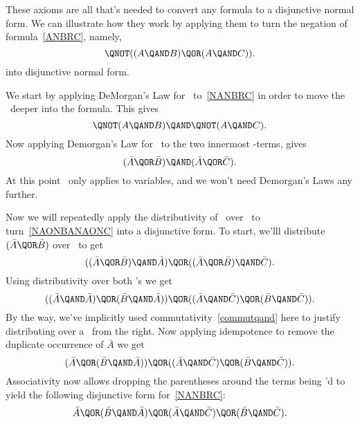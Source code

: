 These axioms are all that's needed to convert any formula to a
disjunctive normal form.  We can illustrate how they work by applying
them to turn the negation of formula~\eqref{ANBRC}, namely,
\begin{equation}\label{NANBRC}
\QNOT((A \QAND B) \QOR (A \QAND C)).
\end{equation}
into disjunctive normal form.

We start by applying DeMorgan's Law for \QOR\ to~\eqref{NANBRC} in
order to move the \QNOT\ deeper into the formula.  This gives
\[
\QNOT(A \QAND B) \QAND \QNOT(A \QAND C).
\]
Now applying Demorgan's Law for \QAND\ to the two
innermost \QAND-terms, gives
\begin{equation}\label{NAONBANAONC}
(\bar{A} \QOR \bar{B}) \QAND (\bar{A} \QOR \bar{C}).
\end{equation}
At this point \QNOT\ only applies to variables, and we won't need
Demorgan's Laws any further.

Now we will repeatedly apply the distributivity of \QAND\ over \QOR\ to
turn~\eqref{NAONBANAONC} into a disjunctive form.  To start, we'lll distribute
$(\bar{A} \QOR \bar{B})$ over \QOR\ to get
\[
((\bar{A} \QOR \bar{B}) \QAND \bar{A}) \QOR ((\bar{A} \QOR \bar{B}) \QAND \bar{C}).
\]
Using distributivity over both \QAND's we get
\[
((\bar{A} \QAND \bar{A}) \QOR (\bar{B} \QAND \bar{A})) \QOR 
((\bar{A} \QAND \bar{C}) \QOR (\bar{B} \QAND \bar{C})).
\]
By the way, we've implicitly used commutativity~\eqref{commutqand}
here to justify distributing over a \QAND\ from the right.  Now
applying idempotence to remove the duplicate occurrence of $\bar{A}$ we
get
\[
(\bar{A} \QOR (\bar{B} \QAND \bar{A})) \QOR 
((\bar{A} \QAND \bar{C}) \QOR (\bar{B} \QAND \bar{C})).
\]
Associativity now allows dropping the parentheses around the terms
being \QOR'd to yield the following disjunctive form for~\eqref{NANBRC}:
\begin{equation}\label{DFNAONBANAONC}
\bar{A} \QOR
(\bar{B} \QAND \bar{A}) \QOR 
(\bar{A} \QAND \bar{C}) \QOR
(\bar{B} \QAND \bar{C}).
\end{equation}

